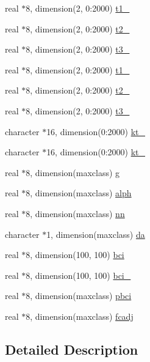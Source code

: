 \begin{DoxyCompactItemize}
\item 
real $\ast$8, dimension(2, 0\-:2000) \hyperlink{classmerck_a5077f091d33060cb8ffc6a427f0f25cd}{t1\-\_}
\item 
real $\ast$8, dimension(2, 0\-:2000) \hyperlink{classmerck_a6dc3f447e2e06723a00ab70628bc0366}{t2\-\_}
\item 
real $\ast$8, dimension(2, 0\-:2000) \hyperlink{classmerck_a7e6fcfd46a21e8ae8c9a624e91648249}{t3\-\_}
\item 
real $\ast$8, dimension(2, 0\-:2000) \hyperlink{classmerck_a8bc86e67b70d3bf5f64dd42af649b029}{t1\-\_}
\item 
real $\ast$8, dimension(2, 0\-:2000) \hyperlink{classmerck_a6b3c6efb5313d650b4f54c20adfa9277}{t2\-\_}
\item 
real $\ast$8, dimension(2, 0\-:2000) \hyperlink{classmerck_af1f812e006b64ca36df99613700e9142}{t3\-\_}
\item 
character $\ast$16, dimension(0\-:2000) \hyperlink{classmerck_aa10f016eb3a7d8312a304167064f3a99}{kt\-\_}
\item 
character $\ast$16, dimension(0\-:2000) \hyperlink{classmerck_ad41bd760bdd60d655b559de57d6c958e}{kt\-\_}
\item 
real $\ast$8, dimension(maxclass) \hyperlink{classmerck_a890725e06686aca0d658cd9def7c604a}{g}
\item 
real $\ast$8, dimension(maxclass) \hyperlink{classmerck_a294bc9b22bc804b6c906db9ca65dc054}{alph}
\item 
real $\ast$8, dimension(maxclass) \hyperlink{classmerck_a7ae1bbbe81c44501bf843c48a81ef02f}{nn}
\item 
character $\ast$1, dimension(maxclass) \hyperlink{classmerck_a73afea490eec3b3fb2a36dd86a533d4a}{da}
\item 
real $\ast$8, dimension(100, 100) \hyperlink{classmerck_a5ab2ebf1fd4e8497680601f27f9dfc4f}{bci}
\item 
real $\ast$8, dimension(100, 100) \hyperlink{classmerck_a4ec458165a6cf8835583b406de9a3dae}{bci\-\_}
\item 
real $\ast$8, dimension(maxclass) \hyperlink{classmerck_aa1c153c0ae05993c88c4ea273ad5650e}{pbci}
\item 
real $\ast$8, dimension(maxclass) \hyperlink{classmerck_a101cae3abb5ea422f3baccff3e448ad6}{fcadj}
\end{DoxyCompactItemize}


\subsection{Detailed Description}


